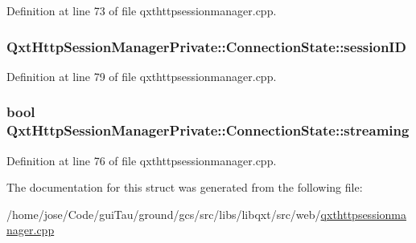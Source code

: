 Definition at line 73 of file qxthttpsessionmanager.\-cpp.

\hypertarget{struct_qxt_http_session_manager_private_1_1_connection_state_a0becaf4b1c6826adc8707bb9b3108ab5}{
\subsubsection[{session\-I\-D}]{ Qxt\-Http\-Session\-Manager\-Private\-::\-Connection\-State\-::session\-I\-D}}\label{struct_qxt_http_session_manager_private_1_1_connection_state_a0becaf4b1c6826adc8707bb9b3108ab5}


Definition at line 79 of file qxthttpsessionmanager.\-cpp.

\hypertarget{struct_qxt_http_session_manager_private_1_1_connection_state_a7b31008523e2809e189670c4bcece433}{
\subsubsection[{streaming}]{\setlength{\rightskip}{0pt plus 5cm}bool Qxt\-Http\-Session\-Manager\-Private\-::\-Connection\-State\-::streaming}}\label{struct_qxt_http_session_manager_private_1_1_connection_state_a7b31008523e2809e189670c4bcece433}


Definition at line 76 of file qxthttpsessionmanager.\-cpp.



The documentation for this struct was generated from the following file\-:\begin{DoxyCompactItemize}
\item 
/home/jose/\-Code/gui\-Tau/ground/gcs/src/libs/libqxt/src/web/\hyperlink{qxthttpsessionmanager_8cpp}{qxthttpsessionmanager.\-cpp}\end{DoxyCompactItemize}
